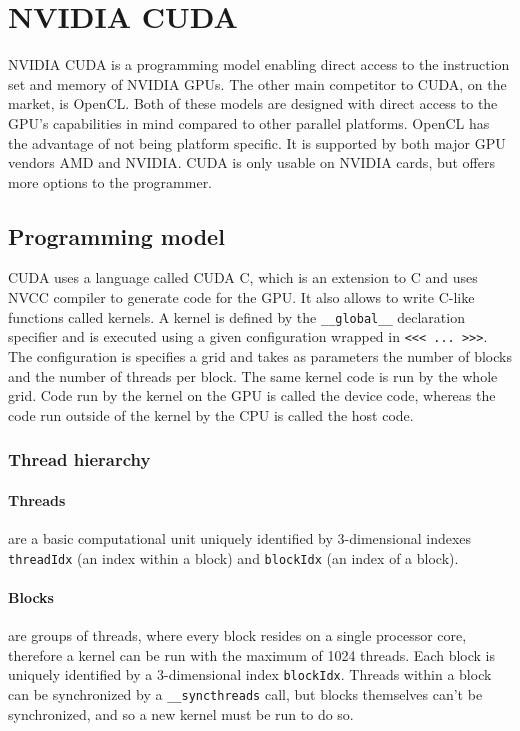 \section{NVIDIA CUDA}

NVIDIA CUDA is a programming model enabling direct access to the instruction set and memory of NVIDIA GPUs. The other main competitor to CUDA, on the market, is OpenCL. Both of these models are designed with direct access to the GPU's capabilities in mind compared to other parallel platforms. OpenCL has the advantage of not being platform specific. It is supported by both major GPU vendors AMD and NVIDIA. CUDA is only usable on NVIDIA cards, but offers more options to the programmer.

\subsection{Programming model}

CUDA uses a language called CUDA C, which is an extension to C and uses NVCC compiler to generate code for the GPU. It also allows to write C-like functions called kernels. A kernel is defined by the \verb|__global__| declaration specifier and is executed using a given configuration wrapped in \verb|<<< ... >>>|. The configuration is specifies a grid and takes as parameters the number of blocks and the number of threads per block. The same kernel code is run by the whole grid. Code run by the kernel on the GPU is called the device code, whereas the code run outside of the kernel by the CPU is called the host code.

\subsubsection{Thread hierarchy}\label{subsubsec:thread-hierarchy}

\paragraph{Threads} are a basic computational unit uniquely identified by 3-dimensional indexes \verb|threadIdx| (an index within a block) and \verb|blockIdx| (an index of a block).

\paragraph{Blocks} are groups of threads, where every block resides on a single processor core, therefore a kernel can be run with the maximum of 1024 threads. Each block is uniquely identified by a 3-dimensional index \verb|blockIdx|. Threads within a block can be synchronized by a \verb|__syncthreads| call, but blocks themselves can't be synchronized, and so a new kernel must be run to do so.

